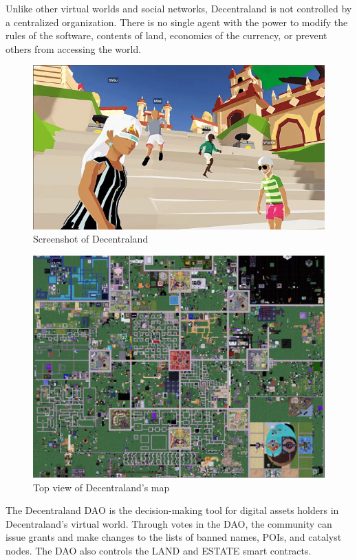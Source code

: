 \documentclass[MSE,Master,english]{twbook}%
\begin{document}
Unlike other virtual worlds and social networks, Decentraland is not controlled by a centralized organization\cite{DCLWhitepaper}. There is no single agent with the power to modify the rules of the software, contents of land, economics of the currency, or prevent others from accessing the world.

\begin{figure}[H]
  \centering
  \includegraphics[width=\textwidth]{dcl.png}
  \caption{Screenshot of Decentraland}
  \label{fig:dcl}
\end{figure}

\begin{figure}[H]
  \centering
  \includegraphics[width=.8\textwidth]{dcl_map.png}
  \caption{Top view of Decentraland's map \cite{genesisCity}}
  \label{fig:dcl_map}
\end{figure}

The Decentraland DAO\cite{DCLDAO} is the decision-making tool for digital assets holders in Decentraland's virtual world. Through votes in the DAO, the community can issue grants and make changes to the lists of banned names, POIs, and catalyst nodes. The DAO also controls the \gls{LAND} and \gls{ESTATE} smart contracts.
\end{document}
